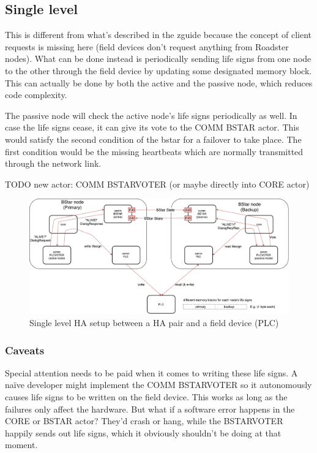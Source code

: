 \subsection{Single level}
This is different from what's described in the \gls{zguide} because the concept of
client requests is missing here (field devices don't request anything from Roadster nodes).  What can be
done instead is periodically sending life signs from one node to the other
through the field device by updating some designated memory block. This can actually be
done by both the active and the passive node, which reduces code complexity.

The passive node will check the active node's life signs periodically as well.
In case the life signs cease, it can give its vote to the COMM BSTAR actor.
This would satisfy the second condition of the \gls{bstar} for a
failover to take place. The first condition would be the missing heartbeats
which are normally transmitted through the network link.

TODO new actor: COMM BSTARVOTER (or maybe directly into CORE actor)

\begin{figure}[]
	\includegraphics[width=\textwidth]{img/SL-HA_bstar.pdf}
	\caption{Single level HA setup between a HA pair and a field device (PLC)}
	\label{fig:sl-ha}
\end{figure}

\subsubsection{Caveats}
Special attention needs to be paid when it comes to writing these life signs. A
na\"ive developer might implement the COMM BSTARVOTER so it autonomously causes
life signs to be written on the field device. This works as long as the failures only affect
the hardware. But what if a software error happens in the CORE or BSTAR actor?
They'd crash or hang, while the BSTARVOTER happily sends out life signs, which it
obviously shouldn't be doing at that moment.

